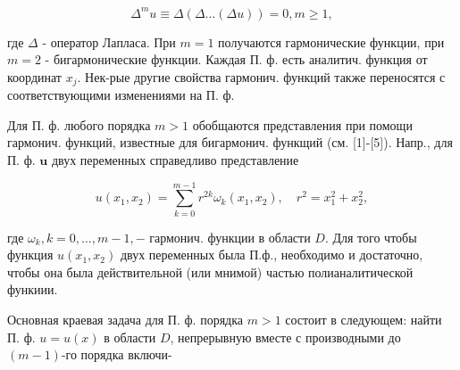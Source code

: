 \documentclass[10pt]{article}
\begin{document}
\[

\Delta^{m} u \equiv \Delta(\Delta \ldots(\Delta u))=0, m \geqslant 1,

\]



где $\Delta$ - оператор Лапласа. При $m=1$ получаются гармонические функции, при $m=2$ - бигармонические функции. Каждая П. ф. есть аналитич. функция от координат $x_{j}$. Нек-рые другие свойства гармонич. функций также переносятся с соответствующими изменениями на П. ф.



Для П. ф. любого порядка $m>1$ обобщаются представления при помощи гармонич. функций, известные для бигармонич. функщий (см. [1]-[5]). Напр., для П. ф. $\boldsymbol{u}$ двух переменных справедливо представление



\[

u\left(x_{1}, x_{2}\right)=\sum_{k=0}^{m-1} r^{2 k} \omega_{k}\left(x_{1}, x_{2}\right), \quad r^{2}=x_{1}^{2}+x_{2}^{2},

\]



где $\omega_{k}, k=0, \ldots, m-1,-$ гармонич. функции в области $D$. Для того чтобы функция $u\left(x_{1}, x_{2}\right)$ двух переменных была П.ф., необходимо и достаточно, чтобы она была действительной (или мнимой) частью полианалитической функиии.



Основная краевая задача для П. ф. порядка $m>1$ состоит в следующем: найти П. ф. $u=u(x)$ в области $D$, непрерывную вместе с производными до $(m-1)$-го порядка включи-
\end{document}
